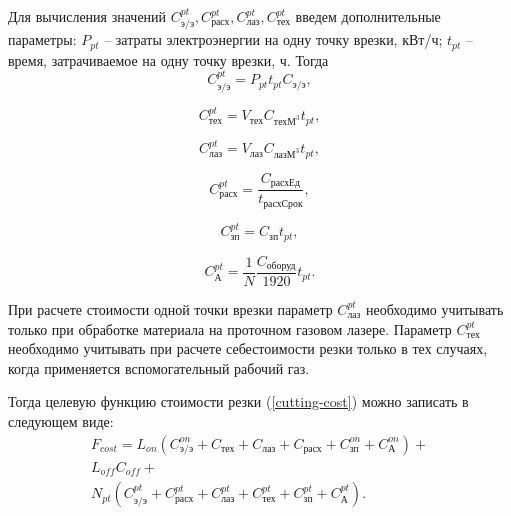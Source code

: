 \documentclass[11pt,twoside,openany]{report}
\begin{document}
Для вычисления значений
$C_\text{э/э}^{pt}, C_\text{расх}^{pt}, C_\text{лаз}^{pt}, C_\text{тех}^{pt}$
введем дополнительные параметры:
$P_{pt}$ -- затраты электроэнергии на одну точку врезки, кВт/ч;
$t_{pt}$ -- время, затрачиваемое на одну точку врезки, ч.
Тогда
\begin{equation}
  C_\text{э/э}^{pt} =
  P_{pt} t_{pt}   C_\text{э/э}
  ,
  \label{c-pt-ee}
\end{equation}

\begin{equation}
  C_\text{тех}^{pt} =
  V_\text{тех} C_{\text{техМ}^3} t_{pt}
  ,
  \label{c-pt-teh}
\end{equation}

\begin{equation}
  C_\text{лаз}^{pt} =
  V_\text{лаз} C_{\text{лазМ}^3} t_{pt}
  ,
  \label{c-pt-laz}
\end{equation}

\begin{equation}
  C_\text{расх}^{pt} =
  \frac{C_\text{расхЕд}}{t_\text{расхСрок}}
  ,
  \label{c-pt-rasx}
\end{equation}

\begin{equation}
  C_\text{зп}^{pt} =
  C_\text{зп} t_{pt}
  ,
  \label{c-pt-zp}
\end{equation}

\begin{equation}
  C_\text{А}^{pt} =
  \frac{1}N \frac{C_\text{оборуд}}{1920} t_{pt}
  .
  \label{c-pt-A}
\end{equation}

При расчете стоимости одной точки врезки параметр
$C_\text{лаз}^{pt}$
необходимо учитывать только при обработке материала
на проточном газовом лазере.
Параметр
$C_\text{тех}^{pt}$
необходимо учитывать при расчете себестоимости резки только в тех случаях,
когда применяется вспомогательный рабочий газ.

Тогда целевую функцию стоимости резки (\ref{cutting-cost})
можно записать в следующем виде:
\begin{multline}
  F_{cost} =
  L_{on} \left(
    C_\text{э/э}^{on} +
    C_\text{тех} +
    C_\text{лаз} +
    C_\text{расх} +
    C_\text{зп}^{on} +
    C_\text{А}^{on}
      \right) +
  \\
  L_{off} C_{off} +
  \\
  N_{pt} \left(
    C_\text{э/э}^{pt} +
    C_\text{расх}^{pt} +
    C_\text{лаз}^{pt} +
    C_\text{тех}^{pt} +
    C_\text{зп}^{pt} +
    C_\text{А}^{pt}
      \right)
  .
  \label{c-full}
\end{multline}
\end{document}
